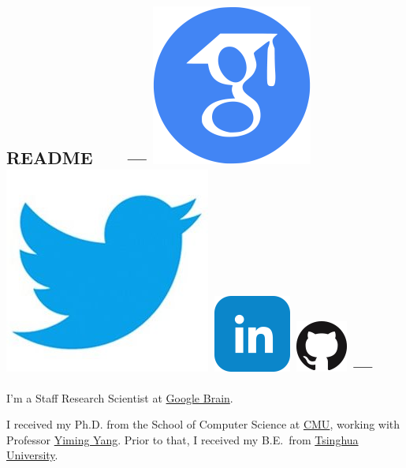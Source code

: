 \documentclass{article}
\begin{document}
\subsection*{README \ \ \ --- \protect
\href{https://scholar.google.com/citations?user=IMkVH_8AAAAJ&hl=en}{\includegraphics[natwidth=22, natheight=22]{img/google-scholar.png}}
\href{https://twitter.com/Hanxiao_6}{\includegraphics[natwidth=22, natheight=22]{img/twitter.jpg}}
\href{https://www.linkedin.com/in/hanxiao-liu-17194a4a/}{\includegraphics[natwidth=22, natheight=22]{img/linkedin.png}}
\href{https://github.com/quark0}{\includegraphics[natwidth=22, natheight=22]{img/GitHub-Mark-64px.png}}
---
}
I'm a Staff Research Scientist at \href{https://ai.google/research/teams/brain}{Google Brain}.

\noindent I received my Ph.D. from
the School of Computer Science at
\href{http://www.cmu.edu/index.shtml}{CMU},
working with Professor \href{http://www.cs.cmu.edu/~yiming/publications.html}{Yiming Yang}.
Prior to that,
I received my B.E.\ from
\href{http://www.tsinghua.edu.cn/publish/newthuen/index.html}{Tsinghua University}.
\end{document}
